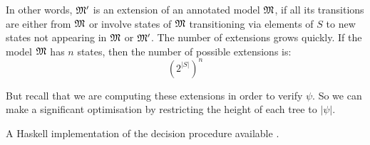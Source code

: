 \NI In other words, $\frak{M}'$ is an extension of an annotated model
$\frak{M}$, if all its transitions are either from $\frak{M}$ or involve
states of $\frak{M}$ transitioning via elements of $S$ to new states not
appearing in $\frak{M}$ or $\frak{M}'$.  The number of extensions grows
quickly.  If the model $\frak{M}$ has $n$ states, then the number of
possible extensions is:
\[
   ({2^{|S|}})^n
\] 

\NI But recall that we are computing these extensions in order to
verify $\psi$. So we can make a significant optimisation by
restricting the height of each tree to $|\psi|$.

A Haskell implementation of the decision procedure available
\cite{HaskellImplementation}.
